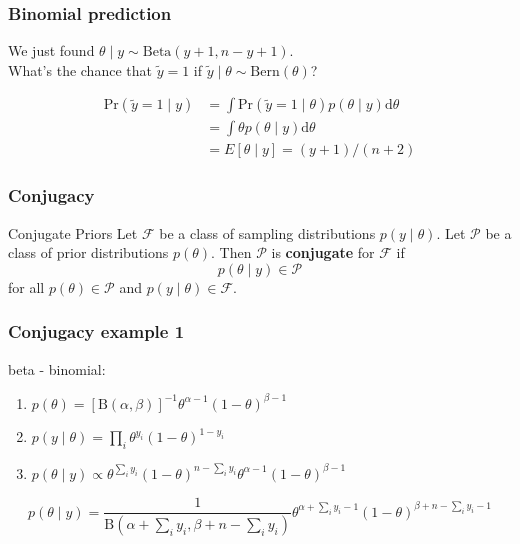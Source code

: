 \documentclass{beamer}
\begin{document}
\begin{frame}[fragile]
\frametitle{Binomial prediction}

We just found $\theta \mid y \sim \text{Beta}(y+1, n-y+1)$. \\
What's the chance that $\tilde{y} = 1$ if $\tilde{y} \mid \theta \sim \text{Bern}(\theta)$?
\pause

\begin{align*}
\text{Pr}(\tilde{y}=1 \mid y) &= \int \text{Pr}(\tilde{y} =1 \mid \theta) p(\theta \mid y) \text{d}\theta \\
&= \int \theta p(\theta \mid y) \text{d}\theta \\
&= E[\theta \mid y] = (y+1)/(n+2)
\end{align*}


\end{frame}




\begin{frame}[fragile]
\frametitle{Conjugacy}

\begin{block}{Conjugate Priors}
Let $\mathcal{F}$ be a class of sampling distributions $p(y \mid \theta)$. Let $\mathcal{P}$ be a class of prior distributions $p(\theta)$. Then $\mathcal{P}$ is {\bf conjugate} for $\mathcal{F}$ if 
\[
p(\theta \mid y) \in \mathcal{P}
\]
for all $p(\theta) \in \mathcal{P}$ and $p(y \mid \theta) \in \mathcal{F}$.
\end{block}

\end{frame}


\begin{frame}[fragile]
\frametitle{Conjugacy example 1}

beta - binomial:
\begin{enumerate}
\item $p(\theta) = [\text{B}(\alpha,\beta)]^{-1} \theta^{\alpha-1}(1-\theta)^{\beta-1}$
\item $p(y \mid \theta) = \prod_i \theta^{y_i}(1-\theta)^{1-y_i} $
\item $p(\theta \mid y) \propto \theta^{\sum_i y_i}(1-\theta)^{n-\sum_i y_i}\theta^{\alpha-1}(1-\theta)^{\beta-1}$
\end{enumerate}


\[
p(\theta \mid y) = \frac{1}{\text{B}(\alpha + \sum_i y_i, \beta + n -
  \sum_i y_i)} \theta^{\alpha + \sum_i y_i - 1}(1-\theta)^{\beta +
  n-\sum_i y_i - 1}
\]

\end{frame}
\end{document}
